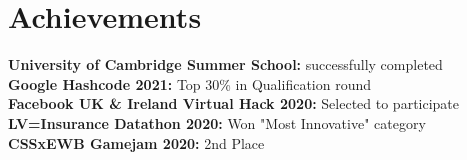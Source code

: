 \documentclass[a4paper,11pt]{article}
\begin{document}
\section{Achievements}
  \textbf{University of Cambridge Summer School:}{ successfully completed} \\
  \textbf{Google Hashcode 2021:} {Top 30\% in Qualification round} \\
  \textbf{Facebook UK \& Ireland Virtual Hack 2020:} {Selected to participate} \\
  \textbf{LV=Insurance Datathon 2020:} {Won "Most Innovative" category} \\
  \textbf{CSSxEWB Gamejam 2020:} {2nd Place} \\
  
\bigskip
\end{document}
